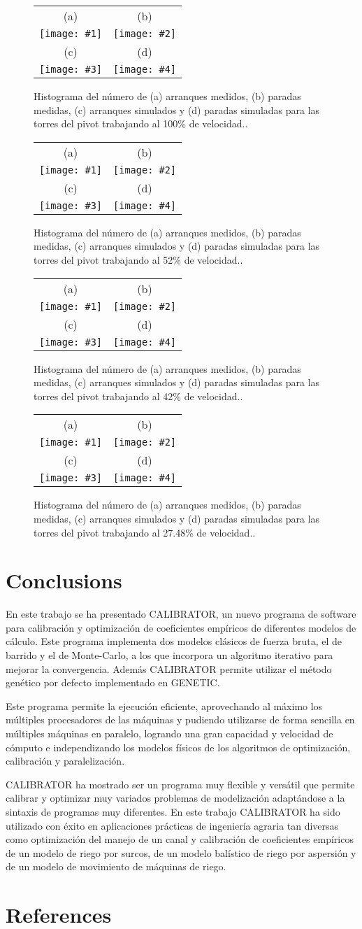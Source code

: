 \documentclass[review,authoryear]{elsarticle}
\newcommand{\FIGIV}[6]
{
	\begin{figure}[ht!]
		\centering
		\begin{tabular}{cc}
			(a) & (b)
			\\ \texttt{[image: \#1]} & \texttt{[image: \#2]}
			\\ (c) & (d)
			\\ \texttt{[image: \#3]} & \texttt{[image: \#4]}
		\end{tabular}
		\caption{#5.\label{#6}}
	\end{figure}
}
\begin{document}
\FIGIV{pivot-measured-starts-100.eps}{pivot-measured-stops-100.eps}
{pivot-simulated-starts-100.eps}{pivot-simulated-stops-100.eps}
{Histograma del número de (a) arranques medidos, (b) paradas medidas, (c)
arranques simulados y (d) paradas simuladas para las torres del pivot trabajando
al 100\% de velocidad.}{FigPivot100}

\FIGIV{pivot-measured-starts-52.eps}{pivot-measured-stops-52.eps}
{pivot-simulated-starts-52.eps}{pivot-simulated-stops-52.eps}
{Histograma del número de (a) arranques medidos, (b) paradas medidas, (c)
arranques simulados y (d) paradas simuladas para las torres del pivot trabajando
al 52\% de velocidad.}{FigPivot52}

\FIGIV{pivot-measured-starts-42.eps}{pivot-measured-stops-42.eps}
{pivot-simulated-starts-42.eps}{pivot-simulated-stops-42.eps}
{Histograma del número de (a) arranques medidos, (b) paradas medidas, (c)
arranques simulados y (d) paradas simuladas para las torres del pivot trabajando
al 42\% de velocidad.}{FigPivot42}

\FIGIV{pivot-measured-starts-27,48.eps}{pivot-measured-stops-27,48.eps}
{pivot-simulated-starts-27,48.eps}{pivot-simulated-stops-27,48.eps}
{Histograma del número de (a) arranques medidos, (b) paradas medidas, (c)
arranques simulados y (d) paradas simuladas para las torres del pivot trabajando
al 27.48\% de velocidad.}{FigPivot27}

\section{Conclusions}

En este trabajo se ha presentado CALIBRATOR, un nuevo programa de software para
calibración y optimización de coeficientes empíricos de diferentes modelos de
cálculo. Este programa implementa dos modelos clásicos de fuerza bruta, el de
barrido y el de Monte-Carlo, a los que incorpora un algoritmo iterativo para
mejorar la convergencia. Además CALIBRATOR permite utilizar el método genético
por defecto implementado en GENETIC.

Este programa permite la ejecución eficiente, aprovechando al máximo los
múltiples procesadores de las máquinas y pudiendo utilizarse de forma sencilla
en múltiples máquinas en paralelo, logrando una gran capacidad y velocidad de
cómputo e independizando los modelos físicos de los algoritmos de optimización,
calibración y paralelización.

CALIBRATOR ha mostrado ser un programa muy flexible y versátil que permite
calibrar y optimizar muy variados problemas de modelización adaptándose a la
sintaxis de programas muy diferentes. En este trabajo CALIBRATOR ha sido
utilizado con éxito en aplicaciones prácticas de ingeniería agraria tan diversas
como optimización del manejo de un canal y calibración de coeficientes empíricos
de un modelo de riego por surcos, de un modelo balístico de riego por aspersión
y de un modelo de movimiento de máquinas de riego.

\section*{References}

\end{document}
